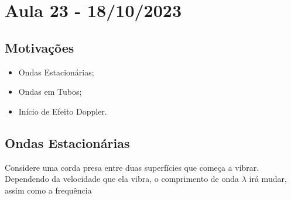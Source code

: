 \documentclass{article}
\begin{document}
\section{Aula 23 - 18/10/2023}
\subsection{Motivações}
\begin{itemize}
  \item Ondas Estacionárias;
  \item Ondas em Tubos;
  \item Início de Efeito Doppler.
\end{itemize}
\subsection{Ondas Estacionárias}
Considere uma corda presa entre duas superfícies que começa a vibrar. Dependendo da velocidade que ela vibra,
o comprimento de onda \(\lambda \) irá mudar, assim como a frequência
\end{document}
